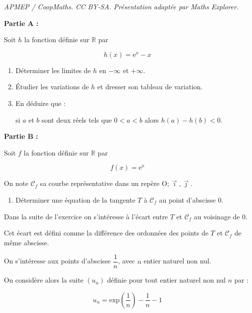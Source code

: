 \documentclass[10pt]{article}
\providecommand{\R}{\mathbb{R}}
\providecommand{\Oij}{\(\mathrm{O};\vec{\imath},\vec{\jmath}\)}
\begin{document}
\noindent\textit{APMEP / CoopMaths. CC BY-SA. Présentation adaptée par Maths Explorer.}\par\medskip
\bigskip

\textbf{Partie A :}

\medskip

Soit $h$ la fonction définie sur $\R$ par

\[h(x) = \text{e}^x - x\]

\smallskip

\begin{enumerate}
\item Déterminer les limites de $h$ en $-\infty$ et $+\infty$.
\item Étudier les variations de $h$ et dresser son tableau de variation. 
\item En déduire que :

si $a$ et $b$ sont deux réels tels que $0 < a < b$ alors $h(a) - h(b) < 0$.
\end{enumerate}

\bigskip

\textbf{Partie B :}

\medskip

Soit $f$ la fonction définie sur $\R$ par

\[f(x) = \text{e}^x\]

On note $\mathcal{C}_f$ sa courbe représentative dans un repère \Oij.

\medskip

\begin{enumerate}
\item Déterminer une équation de la tangente $T$ à $\mathcal{C}_f$ au point d'abscisse 0.
\end{enumerate}

Dans la suite de l'exercice on s'intéresse à l'écart entre $T$ et $\mathcal{C}_f$ au voisinage de $0$.

Cet écart est défini comme la différence des ordonnées des points de $T$ et $\mathcal{C}_f$ de même abscisse.

On s'intéresse aux points d'abscisse $\dfrac{1}{n}$, avec $n$ entier naturel non nul.

On considère alors la suite $\left(u_n\right)$ définie pour tout entier naturel non nul $n$ par :

\[u_n = \text{exp} \left(\dfrac{1}{n}\right) - \dfrac{1}{n} - 1\]
\end{document}
